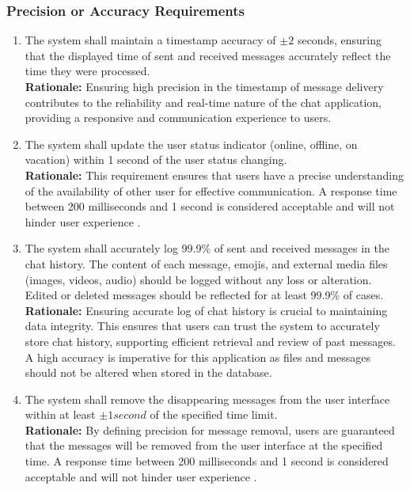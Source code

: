 \documentclass[]{article}
\begin{document}
\subsubsection{Precision or Accuracy Requirements}
\label{ssub:precision_or_accuracy_requirements}
\begin{enumerate}[{PR-PA}1. ]
	\item The system shall maintain a timestamp accuracy of $\pm 2$ seconds, ensuring that the displayed
	      time of sent and received messages accurately reflect the time they were processed. \\
	      {\bf Rationale:} Ensuring high precision in the timestamp of message delivery contributes to the reliability
	      and real-time nature of the chat application,  providing a responsive and communication experience to users.
	\item  The system shall update the user status indicator (online, offline, on vacation) within 1 second of the user
	      status changing. \\
	      {\bf Rationale:} This requirement ensures that users have a precise understanding of the availability of other user for effective communication.
	      A response time between 200 milliseconds and 1 second is considered acceptable and will not hinder user experience
	      \cite{5c}.
	\item  The system shall accurately log 99.9\% of sent and received messages in the chat history. The content of each message, emojis, and external media files (images, videos, audio)
	      should be logged without any loss or alteration. Edited or deleted messages should be reflected for at least 99.9\% of cases. \\
	      {\bf Rationale:} Ensuring accurate log of chat history is crucial to maintaining data integrity. This ensures that users can trust the system to accurately
	      store chat history, supporting efficient retrieval and review of past messages. A high accuracy is imperative for this application as files and messages should not be altered when stored in the database.
	\item The system shall remove the disappearing messages from the user interface within at least $\pm 1 second$ of the specified time limit. \\
	      {\bf Rationale:} By defining precision for message removal, users are guaranteed that the messages will be removed from
	      the user interface at the specified time. A response time between 200 milliseconds and 1 second is considered acceptable and will not hinder user experience
	      \cite{5c}.
\end{enumerate}
\end{document}
